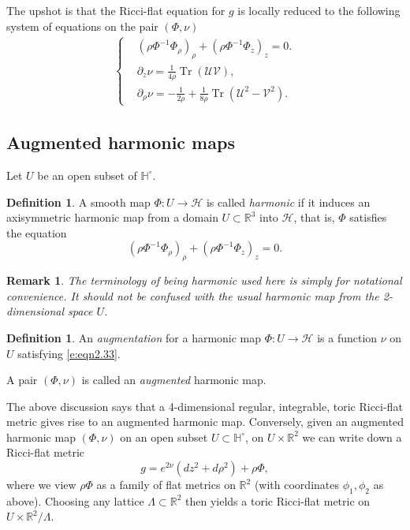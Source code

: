 \documentclass[a4paper,11pt]{amsart}
\newtheorem{remark}[theorem]{Remark}
\theoremstyle{definition}
\newtheorem{definition}[theorem]{Definition}
\numberwithin{equation}{section}
\newcommand{\p}{\partial}
\newcommand{\dH}{\mathbb{H}}
\newcommand{\R}{\mathbb{R}}
\DeclareMathOperator{\Tr}{Tr}
\begin{document}
The upshot is that the Ricci-flat equation for $g$ is locally reduced to the following system of equations on the pair $(\Phi, \nu)$
\begin{align} \label{e:eqn2.33}
	\left\{\begin{aligned}
		&(\rho\Phi^{-1}\Phi_\rho)_\rho+(\rho\Phi^{-1}\Phi_z)_z=0.\\
		&\p_z\nu=\frac{1}{4\rho}\Tr(\mathcal U\mathcal V),\\
		&\p_\rho\nu=-\frac{1}{2\rho}+\frac{1}{8\rho}\Tr(\mathcal U^2-\mathcal V^2).
	\end{aligned}\right.
\end{align}

\subsection{Augmented harmonic maps}
 
Let $U$ be an open subset of $\dH^\circ$.  
\begin{definition}
	A smooth map $\Phi: U\rightarrow \mathcal H$ is called \emph{harmonic} if it induces an axisymmetric harmonic map from a domain $U\subset\R^3$ into $\mathcal{H}$, that is, $\Phi$ satisfies the equation
	\begin{equation}
		(\rho\Phi^{-1}\Phi_\rho)_\rho+(\rho\Phi^{-1}\Phi_z)_z=0.
	\end{equation}
\end{definition}
\begin{remark}
    The terminology of being harmonic used here is simply for notational convenience. It should not be confused with the usual harmonic map from the 2-dimensional space $U$.
\end{remark}

\begin{definition}
	An \emph{augmentation} for a harmonic map $\Phi:U\rightarrow\mathcal H$ is  a function $\nu$ on $U$ satisfying \eqref{e:eqn2.33}. 

A pair $(\Phi, \nu)$ is called an \emph{augmented} harmonic map.
\end{definition}



The above discussion says that a 4-dimensional regular, integrable, toric Ricci-flat metric gives rise to an augmented harmonic map. Conversely, given an augmented harmonic map $(\Phi, \nu)$ on an open subset $U\subset \dH^\circ$, on $U\times \R^2$ we can write down a Ricci-flat metric 
\begin{equation}\label{e:from aug harmonic map to Ricci flat}g=e^{2\nu}(dz^2+d\rho^2)+\rho\Phi,
\end{equation}
where we view $\rho\Phi$ as a family of flat metrics on $\R^2$ (with coordinates $\phi_1, \phi_2$ as above). Choosing any lattice $\Lambda\subset\R^2$ then yields a toric Ricci-flat metric on $U\times \R^2/\Lambda$.
\end{document}
